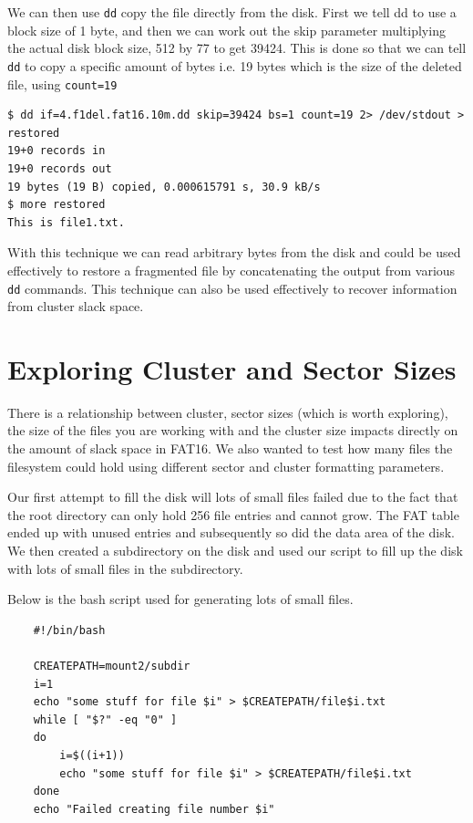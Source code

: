 \documentclass[a4paper,
    11pt,
    normalheadings,
    parindent,
    UKenglish,
    abstracton,
    ]{scrartcl}
\begin{document}
We can then use \texttt{dd} copy the file directly from the disk. First we tell dd to use a block size of 1 byte, and then we can work out the skip parameter multiplying the actual disk block size, 512 by 77 to get 39424. This is done so that we can tell \texttt{dd} to copy a specific amount of bytes i.e. 19 bytes which is the size of the deleted file, using \texttt{count=19}

\begin{verbatim}
$ dd if=4.f1del.fat16.10m.dd skip=39424 bs=1 count=19 2> /dev/stdout > restored
19+0 records in
19+0 records out
19 bytes (19 B) copied, 0.000615791 s, 30.9 kB/s
$ more restored
This is file1.txt.
\end{verbatim}

With this technique we can read arbitrary bytes from the disk and could be used effectively to restore a fragmented file by concatenating the output from various \texttt{dd} commands. This technique can also be used effectively to recover information from cluster slack space.

\section{Exploring Cluster and Sector Sizes}
There is a relationship between cluster, sector sizes (which is worth exploring), the size of the files you are working with and the cluster size impacts directly on the amount of slack space in FAT16. We also wanted to test how many files the filesystem could hold using different sector and cluster formatting parameters.

Our first attempt to fill the disk will lots of small files failed due to the fact that the root directory can only hold 256 file entries and cannot grow. The FAT table ended up with unused entries and subsequently so did the data area of the disk. We then created a subdirectory on the disk and used our script to fill up the disk with lots of small files in the subdirectory.

Below is the bash script used for generating lots of small files.
\begin{verbatim}
    #!/bin/bash

    CREATEPATH=mount2/subdir
    i=1
    echo "some stuff for file $i" > $CREATEPATH/file$i.txt
    while [ "$?" -eq "0" ]
    do
        i=$((i+1))
        echo "some stuff for file $i" > $CREATEPATH/file$i.txt
    done
    echo "Failed creating file number $i"
\end{verbatim}
\end{document}
